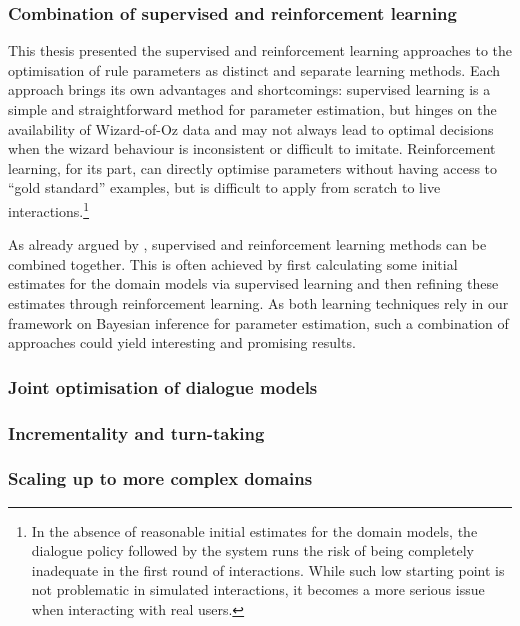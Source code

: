 \subsubsection*{Combination of supervised and reinforcement learning}

This thesis presented the supervised and reinforcement learning approaches to the optimisation of rule parameters as distinct and separate learning methods. Each approach brings its own advantages and shortcomings: supervised learning is a simple and straightforward method for parameter estimation, but hinges on the availability of Wizard-of-Oz data and may not always lead to optimal decisions when the wizard behaviour is inconsistent or difficult to imitate.  Reinforcement learning, for its part, can directly optimise parameters without having access to ``gold standard'' examples, but is difficult to apply from scratch to live interactions.\footnote{In the absence of reasonable initial estimates for the domain models, the dialogue policy followed by the system runs the risk of being completely inadequate in the first round of interactions.  While such low starting point is not problematic in simulated interactions, it becomes a more serious issue when interacting with real users.} 

As already argued by \cite{williams2003,rieser2006,Henderson:2008}, supervised and reinforcement learning methods can be combined together. This is often achieved by first calculating some initial estimates for the domain models via supervised learning and then refining these estimates through reinforcement learning.  As both learning techniques rely in our framework on Bayesian inference for parameter estimation, such a combination of approaches could yield interesting and promising results. 


\subsubsection*{Joint optimisation of dialogue models}


\subsubsection*{Incrementality and turn-taking}

\subsubsection*{Scaling up to more complex domains}




